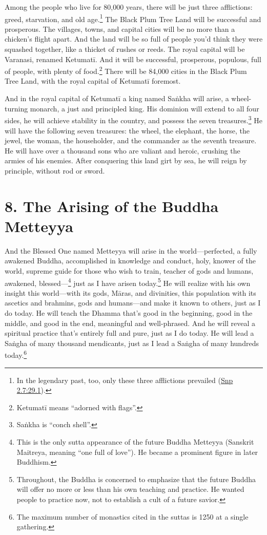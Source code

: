 \documentclass[12pt,openany]{book}%
\begin{document}
Among the people who live for 80,000 years, there will be just three afflictions: greed, starvation, and old age.\footnote{In the legendary past, too, only these three afflictions prevailed (\href{https://suttacentral.net/snp2.7/en/sujato\#29.1}{Snp 2.7:29.1}). } The Black Plum Tree Land will be successful and prosperous. The villages, towns, and capital cities will be no more than a chicken’s flight apart. And the land will be so full of people you’d think they were squashed together, like a thicket of rushes or reeds. The royal capital will be Varanasi, renamed \textsanskrit{Ketumatī}. And it will be successful, prosperous, populous, full of people, with plenty of food.\footnote{\textsanskrit{Ketumatī} means “adorned with flags”. } There will be 84,000 cities in the Black Plum Tree Land, with the royal capital of \textsanskrit{Ketumatī} foremost. 

And in the royal capital of \textsanskrit{Ketumatī} a king named \textsanskrit{Saṅkha} will arise, a wheel-turning monarch, a just and principled king. His dominion will extend to all four sides, he will achieve stability in the country, and possess the seven treasures.\footnote{\textsanskrit{Saṅkha} is “conch shell”. } He will have the following seven treasures: the wheel, the elephant, the horse, the jewel, the woman, the householder, and the commander as the seventh treasure. He will have over a thousand sons who are valiant and heroic, crushing the armies of his enemies. After conquering this land girt by sea, he will reign by principle, without rod or sword. 

\section*{8. The Arising of the Buddha Metteyya }

And the Blessed One named Metteyya will arise in the world—perfected, a fully awakened Buddha, accomplished in knowledge and conduct, holy, knower of the world, supreme guide for those who wish to train, teacher of gods and humans, awakened, blessed—\footnote{This is the only sutta appearance of the future Buddha Metteyya (Sanskrit Maitreya, meaning “one full of love”). He became a prominent figure in later Buddhism. } just as I have arisen today.\footnote{Throughout, the Buddha is concerned to emphasize that the future Buddha will offer no more or less than his own teaching and practice. He wanted people to practice now, not to establish a cult of a future savior. } He will realize with his own insight this world—with its gods, \textsanskrit{Māras}, and divinities, this population with its ascetics and brahmins, gods and humans—and make it known to others, just as I do today. He will teach the Dhamma that’s good in the beginning, good in the middle, and good in the end, meaningful and well-phrased. And he will reveal a spiritual practice that’s entirely full and pure, just as I do today. He will lead a \textsanskrit{Saṅgha} of many thousand mendicants, just as I lead a \textsanskrit{Saṅgha} of many hundreds today.\footnote{The maximum number of monastics cited in the suttas is 1250 at a single gathering. } 
\end{document}
